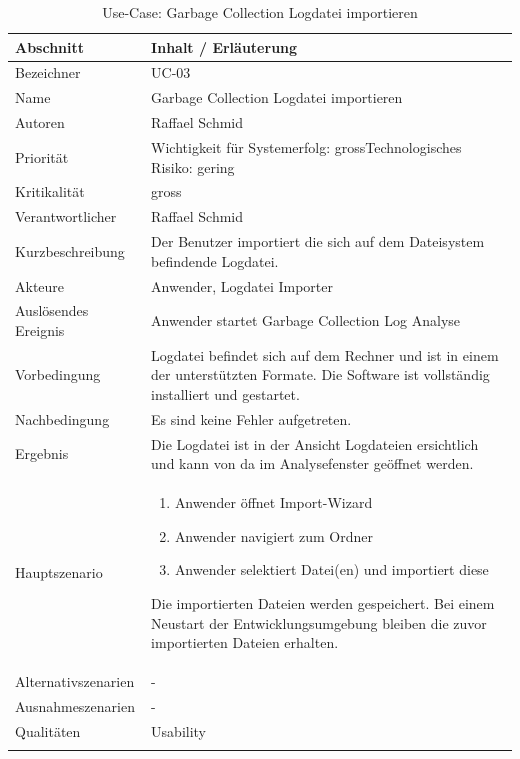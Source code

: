 \begin{longtable}{|p{4cm}|p{10.5cm}|}
\hline
   \textbf{Abschnitt} & \textbf{Inhalt / Erläuterung} \\\hline
   Bezeichner & UC-03\\\hline
   Name & Garbage Collection Logdatei importieren\\\hline
   Autoren & Raffael Schmid\\\hline
   Priorität & Wichtigkeit für Systemerfolg: gross\newline Technologisches Risiko: gering\\\hline
   Kritikalität & gross\\\hline
   Verantwortlicher & Raffael Schmid\\\hline
   Kurzbeschreibung & Der Benutzer importiert die sich auf dem Dateisystem befindende Logdatei.\\\hline
   Akteure & Anwender, Logdatei Importer\\\hline
   Auslösendes Ereignis & Anwender startet Garbage Collection Log Analyse\\\hline
   Vorbedingung & Logdatei befindet sich auf dem Rechner und ist in einem der unterstützten Formate. Die Software ist vollständig installiert und gestartet.\\\hline
   Nachbedingung & Es sind keine Fehler aufgetreten. \\\hline
   Ergebnis & Die Logdatei ist in der Ansicht Logdateien ersichtlich und kann von da im Analysefenster geöffnet werden.\\\hline
   Hauptszenario & 
	\begin{enumerate}
		\item Anwender öffnet Import-Wizard
		\item Anwender navigiert zum Ordner
		\item Anwender selektiert Datei(en) und importiert diese
	\end{enumerate}
Die importierten Dateien werden gespeichert. Bei einem Neustart der Entwicklungsumgebung bleiben die zuvor importierten Dateien erhalten.
	\\\hline
   Alternativszenarien & -\\\hline
   Ausnahmeszenarien & -\\\hline
   Qualitäten & Usability\\\hline
\caption{Use-Case: Garbage Collection Logdatei importieren}
\end{longtable}

